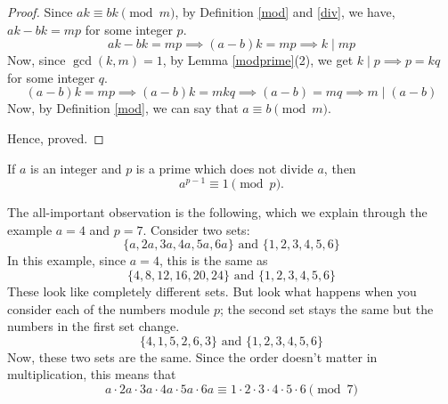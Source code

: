 \begin{proof}
	Since $ak \equiv bk \pmod m$, by Definition \ref{mod} and \ref{div}, we have, $ak - bk = mp$ for some integer $p$.
	$$ak-bk = mp \implies (a-b)k = mp \implies k \mid mp$$
	Now, since $\gcd(k,m) = 1$, by Lemma \ref{modprime}(2), we get $k \mid p \implies p = kq$ for some integer $q$.
	$$(a-b)k = mp \implies (a-b)k = mkq \implies (a-b) = mq \implies m \mid (a-b)$$
	Now, by Definition \ref{mod}, we can say that $a \equiv b \pmod m$.

	Hence, proved.
\end{proof}


\begin{theorem}
	If $a$ is an integer and $p$ is a prime which does not divide $a$, then 
	$$a^{p-1} \equiv 1 \pmod p.$$
\end{theorem}

\begin{scratch}
	The all-important observation is the following, which we explain through the example $a = 4$ and $p = 7$. Consider two sets:
	$$\{a, 2a, 3a, 4a, 5a, 6a\} \text{ and } \{1, 2, 3, 4, 5, 6\}$$
	In this example, since $a = 4$, this is the same as 
	$$\{4, 8, 12, 16, 20, 24\} \text{ and } \{1, 2, 3, 4, 5, 6\}$$
	These look like completely different sets. But look what happens when you consider each of the numbers module $p$; the second set stays the same but the numbers in the first set change.
	$$\{4, 1, 5, 2, 6, 3\} \text{ and } \{1, 2, 3, 4, 5, 6\}$$
	Now, these two sets are the same. Since the order doesn't matter in multiplication, this means that
	$$a \cdot 2a \cdot 3a \cdot 4a \cdot 5a \cdot 6a \equiv 1 \cdot 2 \cdot 3 \cdot 4 \cdot 5 \cdot 6 \pmod 7$$
\end{scratch}

